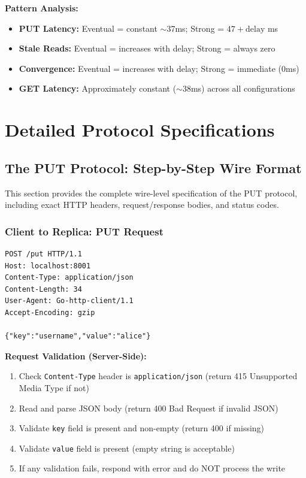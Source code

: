 \documentclass[10pt,a4paper]{article}
\begin{document}
\textbf{Pattern Analysis:}
\begin{itemize}
    \item \textbf{PUT Latency:} Eventual = constant $\sim$37ms; Strong = $47 + \text{delay}$ ms
    \item \textbf{Stale Reads:} Eventual = increases with delay; Strong = always zero
    \item \textbf{Convergence:} Eventual = increases with delay; Strong = immediate (0ms)
    \item \textbf{GET Latency:} Approximately constant ($\sim$38ms) across all configurations
\end{itemize}

\newpage

\section{Detailed Protocol Specifications}

\subsection{The PUT Protocol: Step-by-Step Wire Format}

This section provides the complete wire-level specification of the PUT protocol, including exact HTTP headers, request/response bodies, and status codes.

\subsubsection{Client to Replica: PUT Request}

\begin{verbatim}
POST /put HTTP/1.1
Host: localhost:8001
Content-Type: application/json
Content-Length: 34
User-Agent: Go-http-client/1.1
Accept-Encoding: gzip

{"key":"username","value":"alice"}
\end{verbatim}

\textbf{Request Validation (Server-Side):}
\begin{enumerate}
    \item Check \texttt{Content-Type} header is \texttt{application/json} (return 415 Unsupported Media Type if not)
    \item Read and parse JSON body (return 400 Bad Request if invalid JSON)
    \item Validate \texttt{key} field is present and non-empty (return 400 if missing)
    \item Validate \texttt{value} field is present (empty string is acceptable)
    \item If any validation fails, respond with error and do NOT process the write
\end{enumerate}
\end{document}

